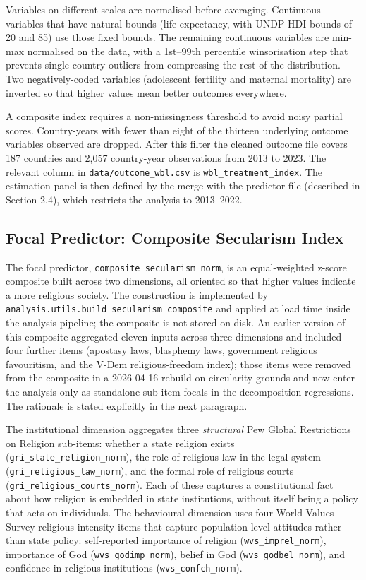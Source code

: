 \documentclass[12pt,a4paper]{article}
\begin{document}
Variables on different scales are normalised before averaging. Continuous variables that have natural bounds (life expectancy, with UNDP HDI bounds of 20 and 85) use those fixed bounds. The remaining continuous variables are min-max normalised on the data, with a 1st--99th percentile winsorisation step that prevents single-country outliers from compressing the rest of the distribution. Two negatively-coded variables (adolescent fertility and maternal mortality) are inverted so that higher values mean better outcomes everywhere.

A composite index requires a non-missingness threshold to avoid noisy partial scores. Country-years with fewer than eight of the thirteen underlying outcome variables observed are dropped. After this filter the cleaned outcome file covers 187 countries and 2{,}057 country-year observations from 2013 to 2023. The relevant column in \texttt{data/outcome\_wbl.csv} is \texttt{wbl\_treatment\_index}. The estimation panel is then defined by the merge with the predictor file (described in Section 2.4), which restricts the analysis to 2013--2022.

\subsection{Focal Predictor: Composite Secularism Index}

The focal predictor, \texttt{composite\_secularism\_norm}, is an equal-weighted z-score composite built across two dimensions, all oriented so that higher values indicate a more religious society. The construction is implemented by \texttt{analysis.utils.build\_secularism\_composite} and applied at load time inside the analysis pipeline; the composite is not stored on disk. An earlier version of this composite aggregated eleven inputs across three dimensions and included four further items (apostasy laws, blasphemy laws, government religious favouritism, and the V-Dem religious-freedom index); those items were removed from the composite in a 2026-04-16 rebuild on circularity grounds and now enter the analysis only as standalone sub-item focals in the decomposition regressions. The rationale is stated explicitly in the next paragraph.

The institutional dimension aggregates three \emph{structural} Pew Global Restrictions on Religion sub-items: whether a state religion exists (\texttt{gri\_state\_religion\_norm}), the role of religious law in the legal system (\texttt{gri\_religious\_law\_norm}), and the formal role of religious courts (\texttt{gri\_religious\_courts\_norm}). Each of these captures a constitutional fact about how religion is embedded in state institutions, without itself being a policy that acts on individuals. The behavioural dimension uses four World Values Survey religious-intensity items that capture population-level attitudes rather than state policy: self-reported importance of religion (\texttt{wvs\_imprel\_norm}), importance of God (\texttt{wvs\_godimp\_norm}), belief in God (\texttt{wvs\_godbel\_norm}), and confidence in religious institutions (\texttt{wvs\_confch\_norm}).
\end{document}
